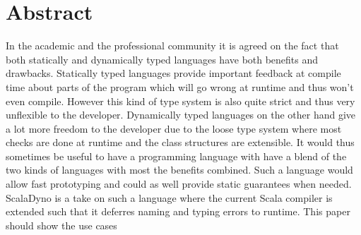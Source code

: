 \section{Abstract}

In the academic and the professional community it is agreed on the fact that
both statically and dynamically typed languages have both benefits and
drawbacks. Statically typed languages provide important feedback at compile time
about parts of the program which will go wrong at runtime and thus won't even
compile. However this kind of type system is also quite strict and thus very
unflexible to the developer.
Dynamically typed languages on the other hand give a lot more freedom to the
developer due to the loose type system where most checks are done at runtime and
the class structures are extensible. It would thus sometimes be useful to have a
programming language with have a blend of the two kinds of languages with most
the benefits combined. Such a language would allow fast prototyping and could as
well provide static guarantees when needed.
ScalaDyno is a take on such a language where the current Scala compiler is
extended such that it deferres naming and typing errors to runtime. This paper
should show the use cases
